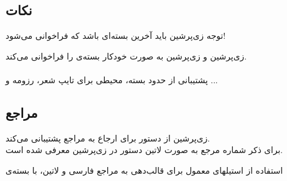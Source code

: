 \subsection{نکات}
\begin{plainslide}
\begin{alertblock}{توجه}
زی‌پرشین باید آخرین بسته‌ای باشد که فراخوانی می‌شود!
\end{alertblock}
{}
\begin{block}{زی‌پرشین و }
زی‌پرشین به صورت خودکار بسته‌ی  را فراخوانی می‌کند.\\
 \\
پشتیبانی از حدود  بسته، محیطی برای تایپ شعر، رزومه و ...

\end{block}


\end{plainslide}
%

\label{Sec:Others}
\subsection{مراجع}
\begin{plainslide}
زی‌پرشین از دستور  برای ارجاع به مراجع پشتیبانی می‌کند. \\
برای ذکر شماره مرجع به صورت لاتین دستور  در زی‌پرشین معرفی شده است.

استفاده از استیلهای معمول برای قالب‌دهی به مراجع فارسی و لاتین، با بسته‌ی 
\end{plainslide}

